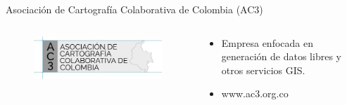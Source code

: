 \documentclass{beamer}
\begin{document}
\begin{frame}{Asociación de Cartografía Colaborativa de Colombia (AC3)}

  \begin{columns}
    \begin{column}{.5\textwidth}
      \begin{figure}
        \centering
        \includegraphics[width=\textwidth]{img/ac3.jpg}
      \end{figure}
    \end{column}

    \begin{column}{.5\textwidth}
      \begin{itemize}
      \item Empresa enfocada en generación de datos libres y otros servicios GIS.
      \item www.ac3.org.co
      \end{itemize}

    \end{column}
  \end{columns}


\end{frame}
\end{document}

